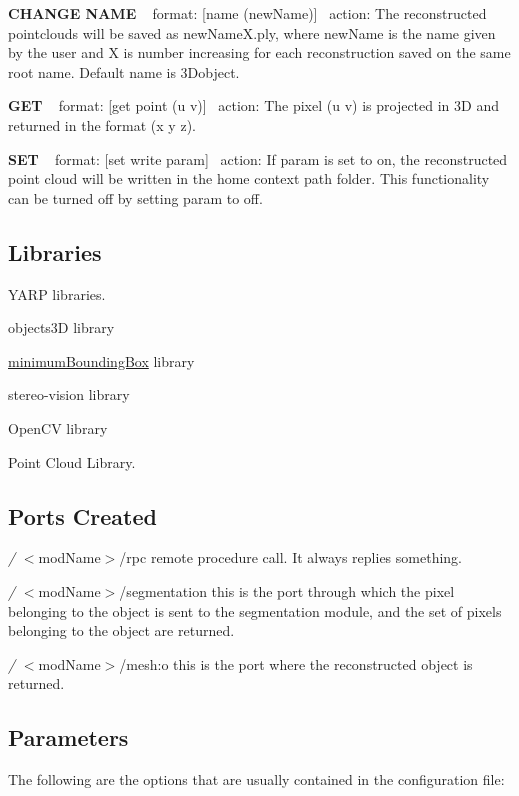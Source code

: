 {\bfseries C\+H\+A\+N\+G\+E N\+A\+M\+E} ~\newline
format\+: \mbox{[}name (new\+Name)\mbox{]}~\newline
action\+: The reconstructed pointclouds will be saved as new\+Name\+X.\+ply, where new\+Name is the name given by the user and X is number increasing for each reconstruction saved on the same root name. Default name is 3\+Dobject.

{\bfseries G\+E\+T} ~\newline
format\+: \mbox{[}get point (u v)\mbox{]}~\newline
action\+: The pixel (u v) is projected in 3\+D and returned in the format (x y z).

{\bfseries S\+E\+T} ~\newline
format\+: \mbox{[}set write param\mbox{]}~\newline
action\+: If param is set to on, the reconstructed point cloud will be written in the home context path folder. This functionality can be turned off by setting param to off.\hypertarget{group__handIKModule_lib_sec}{}\subsection{Libraries}\label{group__handIKModule_lib_sec}

\begin{DoxyItemize}
\item Y\+A\+R\+P libraries.
\item objects3\+D library
\item \hyperlink{group__minimumBoundingBox}{minimum\+Bounding\+Box} library
\item stereo-\/vision library
\item Open\+C\+V library
\item Point Cloud Library.
\end{DoxyItemize}\hypertarget{group__handIKModule_portsc_sec}{}\subsection{Ports Created}\label{group__handIKModule_portsc_sec}

\begin{DoxyItemize}
\item {\itshape /} $<$mod\+Name$>$/rpc remote procedure call. It always replies something.
\item {\itshape /} $<$mod\+Name$>$/segmentation this is the port through which the pixel belonging to the object is sent to the segmentation module, and the set of pixels belonging to the object are returned.
\item {\itshape /} $<$mod\+Name$>$/mesh\+:o this is the port where the reconstructed object is returned.
\end{DoxyItemize}\hypertarget{group__handIKModule_parameters_sec}{}\subsection{Parameters}\label{group__handIKModule_parameters_sec}
The following are the options that are usually contained in the configuration file\+:

